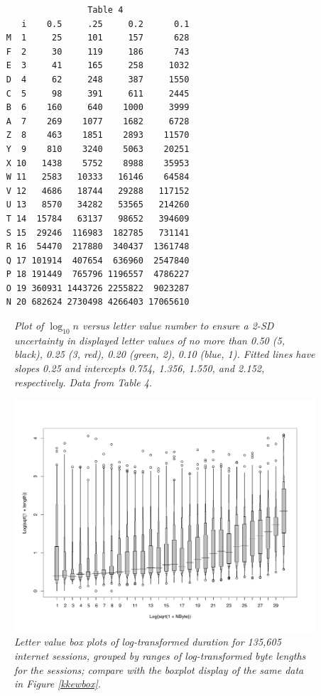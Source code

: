 \documentclass[oneside]{article}
\begin{document}
\begin{verbatim}
                    Table 4
       i    0.5     .25     0.2      0.1
    M  1     25     101     157      628
    F  2     30     119     186      743
    E  3     41     165     258     1032
    D  4     62     248     387     1550
    C  5     98     391     611     2445
    B  6    160     640    1000     3999
    A  7    269    1077    1682     6728
    Z  8    463    1851    2893    11570
    Y  9    810    3240    5063    20251
    X 10   1438    5752    8988    35953
    W 11   2583   10333   16146    64584
    V 12   4686   18744   29288   117152
    U 13   8570   34282   53565   214260
    T 14  15784   63137   98652   394609
    S 15  29246  116983  182785   731141
    R 16  54470  217880  340437  1361748
    Q 17 101914  407654  636960  2547840
    P 18 191449  765796 1196557  4786227
    O 19 360931 1443726 2255822  9023287
    N 20 682624 2730498 4266403 17065610
\end{verbatim}


\begin{figure}[hbt]
\begin{center}
\caption{\it \label{figyy} Plot of $\log_10 n$ versus
letter value number to ensure a 2-SD uncertainty in
displayed letter values of no more than 0.50 (5, black),
0.25 (3, red), 0.20 (green, 2), 0.10 (blue, 1).  
Fitted lines have slopes 0.25 and intercepts 
0.754, 1.356, 1.550, and 2.152, respectively.
Data from Table 4.}
\end{center}
\end{figure}



\begin{figure}[hbt]
\begin{center}
\includegraphics[scale=.6,angle=270]{lvbox2}
\caption{\it \label{lvplot2} Letter value box plots of log-transformed
duration for 135,605 internet sessions, grouped by 
ranges of log-transformed byte lengths for the sessions; compare
with the boxplot display of the same data in Figure \ref{kkewbox}.}
\end{center}
\end{figure}
\end{document}
